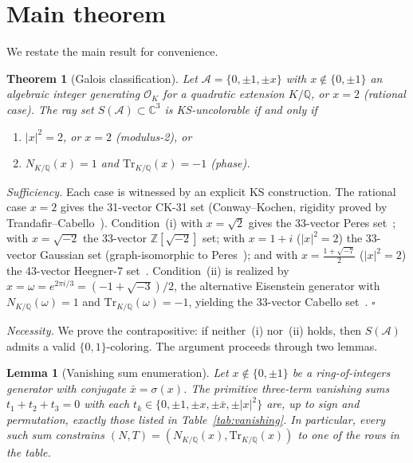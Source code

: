 \documentclass[12pt,a4paper]{article}
\newtheorem{theorem}{Theorem}
\newtheorem{lemma}{Lemma}
\newcommand{\C}{\mathbb{C}}
\newcommand{\Z}{\mathbb{Z}}
\newcommand{\Q}{\mathbb{Q}}
\newcommand{\Norm}[1]{N_{K/\Q}\!\left(#1\right)}
\newcommand{\Tr}[1]{\mathrm{Tr}_{K/\Q}\!\left(#1\right)}
\begin{document}
\section{Main theorem}\label{sec:proof}

We restate the main result for convenience.

\begin{theorem}[Galois classification]\label{thm:galois}
Let $\mathcal{A} = \{0,\pm 1,\pm x\}$ with $x \notin \{0,\pm 1\}$ an
algebraic integer generating $\mathcal{O}_K$ for a quadratic extension
$K/\Q$, or $x = 2$ (rational case).  The ray set
$S(\mathcal{A}) \subset \C^3$ is KS-uncolorable if and only if
\begin{enumerate}
  \item[\emph{(i)}] $|x|^2 = 2$, or $x = 2$ \emph{(modulus-2)}, or
  \item[\emph{(ii)}] $\Norm{x} = 1$ and $\Tr{x} = -1$ \emph{(phase)}.
\end{enumerate}
\end{theorem}

\noindent\textit{Sufficiency.}
Each case is witnessed by an explicit KS construction.  The rational
case $x = 2$ gives the 31-vector CK-31 set (Conway--Kochen, rigidity
proved by Trandafir--Cabello~\cite{TrandafirCabello2025}).
Condition~(i) with $x = \sqrt{2}$ gives the 33-vector Peres
set~\cite{Peres1991}; with $x = \sqrt{-2}$ the 33-vector
$\Z[\sqrt{-2}]$ set; with $x = 1{+}i$ ($|x|^2 = 2$) the 33-vector
Gaussian set (graph-isomorphic to
Peres~\cite{Kernaghan2026islands}); and with
$x = \tfrac{1+\sqrt{-7}}{2}$ ($|x|^2 = 2$) the 43-vector Heegner-7
set~\cite{Kernaghan2026islands}.  Condition~(ii) is realized by
$x = \omega = e^{2\pi i/3} = (-1{+}\sqrt{-3})/2$, the alternative
Eisenstein generator with $\Norm{\omega} = 1$ and
$\Tr{\omega} = -1$, yielding the 33-vector Cabello
set~\cite{Cabello2025simplest}.  \hfill$\square$

\medskip

\noindent\textit{Necessity.}
We prove the contrapositive: if neither~(i) nor~(ii) holds, then
$S(\mathcal{A})$ admits a valid $\{0,1\}$-coloring.  The argument
proceeds through two lemmas.

\begin{lemma}[Vanishing sum enumeration]\label{lem:vanishing}
Let $x \notin \{0,\pm 1\}$ be a ring-of-integers generator with
conjugate $\bar{x} = \sigma(x)$.  The primitive three-term vanishing
sums $t_1 + t_2 + t_3 = 0$ with each $t_k \in
\{0,\pm 1,\pm x,\pm \bar{x},\pm |x|^2\}$ are, up to sign and
permutation, exactly those listed in Table~\ref{tab:vanishing}.  In
particular, every such sum constrains $(N,T) = (\Norm{x},\Tr{x})$ to
one of the rows in the table.
\end{lemma}
\end{document}
